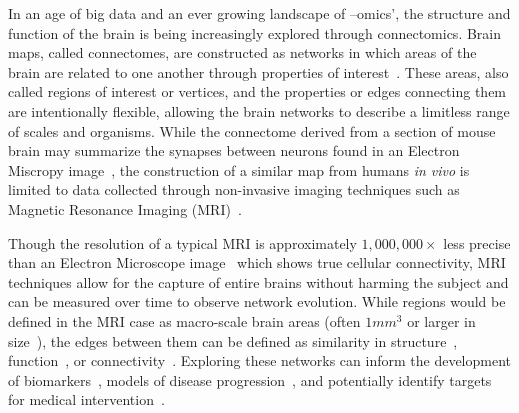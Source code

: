 In an age of big data and an ever growing landscape of –omics', the structure and function of the brain is being
increasingly explored through connectomics. Brain maps, called connectomes, are constructed as networks in which areas
of the brain are related to one another through properties of interest~\cite{fornito2015connectomics}. These areas,
also called regions of interest or vertices, and the properties or edges connecting them are intentionally flexible,
allowing the brain networks to describe a limitless range of scales and organisms. While the connectome derived from a
section of mouse brain may summarize the synapses between neurons found in an Electron Miscropy
image~\cite{zingg2014neural}, the construction of a similar map from humans \textit{in vivo} is limited to data
collected through non-invasive imaging techniques such as Magnetic Resonance Imaging
(MRI)~\cite{sporns2013human,van2012future,hagmann2005diffusion}.

Though the resolution of a typical MRI is approximately $1,000,000 \times$ less precise than an Electron Microscope
image~\cite{kasthuri2015saturated} which shows true cellular connectivity, MRI techniques allow for the capture of
entire brains without harming the subject and can be measured over time to observe network evolution. While regions
would be defined in the MRI case as macro-scale brain areas (often $1mm^3$ or larger in
size~\cite{sotiropoulos2013advances}), the edges between them can be defined as similarity in
structure~\cite{zielinski2010network,alexander2013convergence,montembeault2012impact},
function~\cite{zuo2012network,cao2014topological,kelly2012characterizing}, or
connectivity~\cite{sporns2005human,ingalhalikar2014sex,sporns2013human}. Exploring these networks can inform the
development of biomarkers~\cite{alexander2013convergence,ingalhalikar2014sex}, models of disease
progression~\cite{shah2017altered,yan2018rich}, and potentially identify targets for medical
intervention~\cite{silasi2014stroke,iturria2017multifactorial}.

